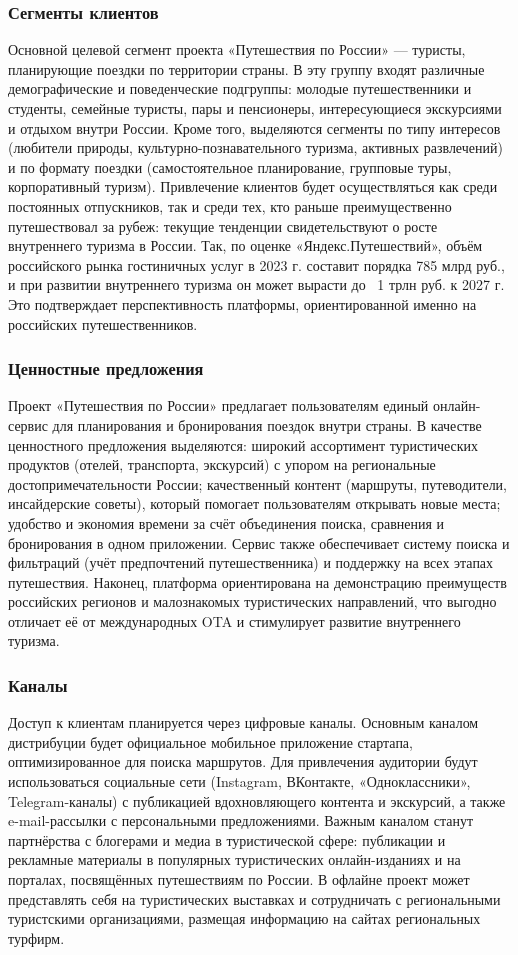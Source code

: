 \subsubsection*{Сегменты клиентов}
Основной целевой сегмент проекта «Путешествия по России» — туристы, планирующие поездки по территории страны. В эту группу входят различные демографические и поведенческие подгруппы: молодые путешественники и студенты, семейные туристы, пары и пенсионеры, интересующиеся экскурсиями и отдыхом внутри России. Кроме того, выделяются сегменты по типу интересов (любители природы, культурно-познавательного туризма, активных развлечений) и по формату поездки (самостоятельное планирование, групповые туры, корпоративный туризм). Привлечение клиентов будет осуществляться как среди постоянных отпускников, так и среди тех, кто раньше преимущественно путешествовал за рубеж: текущие тенденции свидетельствуют о росте внутреннего туризма в России. Так, по оценке «Яндекс.Путешествий», объём российского рынка гостиничных услуг в 2023 г. составит порядка 785 млрд руб., и при развитии внутреннего туризма он может вырасти до ~1 трлн руб. к 2027 г. Это подтверждает перспективность платформы, ориентированной именно на российских путешественников.

\subsubsection*{Ценностные предложения}
Проект «Путешествия по России» предлагает пользователям единый онлайн-сервис для планирования и бронирования поездок внутри страны. В качестве ценностного предложения выделяются: широкий ассортимент туристических продуктов (отелей, транспорта, экскурсий) с упором на региональные достопримечательности России; качественный контент (маршруты, путеводители, инсайдерские советы), который помогает пользователям открывать новые места; удобство и экономия времени за счёт объединения поиска, сравнения и бронирования в одном приложении. Сервис также обеспечивает систему поиска и фильтраций (учёт предпочтений путешественника) и поддержку на всех этапах путешествия. Наконец, платформа ориентирована на демонстрацию преимуществ российских регионов и малознакомых туристических направлений, что выгодно отличает её от международных OTA и стимулирует развитие внутреннего туризма.

\subsubsection*{Каналы}
Доступ к клиентам планируется через цифровые каналы. Основным каналом дистрибуции будет официальное мобильное приложение стартапа, оптимизированное для поиска маршрутов. Для привлечения аудитории будут использоваться социальные сети (Instagram, ВКонтакте, «Одноклассники», Telegram-каналы) с публикацией вдохновляющего контента и экскурсий, а также e-mail-рассылки с персональными предложениями. Важным каналом станут партнёрства с блогерами и медиа в туристической сфере: публикации и рекламные материалы в популярных туристических онлайн-изданиях и на порталах, посвящённых путешествиям по России. В офлайне проект может представлять себя на туристических выставках и сотрудничать с региональными туристскими организациями, размещая информацию на сайтах региональных турфирм.

